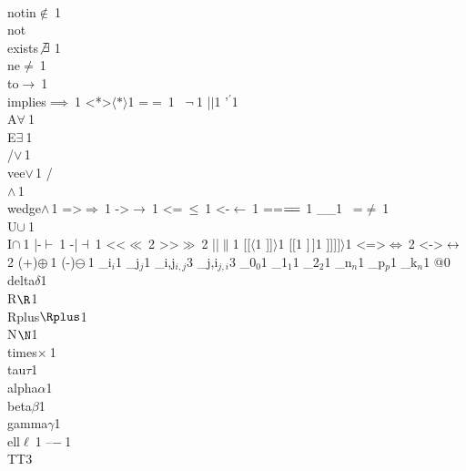 {		{\\notin}{{$\notin\ $}}1
		{\\not\\exists}{{$\not\exists\ $}}1
		{\\ne}{{$\ne\ $}}1
		{\\to}{{$\to\ $}}1
		{\\implies}{{$\implies\ $}}1
		{<*>}{{$\langle*\rangle$}}1
		{=}{{$=\ $}}1
		{~}{{$\neg\ $}}1
		{|}{{$\mid$}}1
		{'}{{$^\prime$}}1
		{\\A}{{$\forall\ $}}1
		{\\E}{{$\exists\ $}}1
		{\\/}{{$\vee\,$}}1
		{\\vee}{{$\vee\,$}}1
		{/\\}{{$\wedge\,$}}1
		{\\wedge}{{$\wedge\,$}}1
		{=>}{{$\Rightarrow\ $}}1
		{->}{{$\rightarrow\ $}}1
		{<=}{{$\ \leq\ $}}1
		{<-}{{$\leftarrow\ $}}1
		{==}{{$=\mathrel{\mkern-3mu}=\ $}}1
		{_}{{\_}}1
		{~=}{{$\neq\ $}}1
		{\\U}{{$\cup\ $}}1
		{\\I}{{$\cap\ $}}1
		{|-}{{$\vdash\ $}}1
		{-|}{{$\dashv\ $}}1
		{<<}{{$\ll\ $}}2
		{>>}{{$\gg\ $}}2
		{||}{{$\|$}}1
		{[[}{{$\langle$}}1
		{]]}{{$\rangle$}}1
		{[}{{$[$}}1
		{]}{{$\,]$}}1
		{]]]}{{$]\rangle$}}1
		{<=>}{{$\Leftrightarrow\ $}}2
		{<->}{{$\leftrightarrow\ $}}2
		{(+)}{{$\oplus\ $}}1
		{(-)}{{$\ominus\ $}}1
		{_i}{{$_{i}$}}1
		{_j}{{$_{j}$}}1
		{_{i,j}}{{$_{i,j}$}}3
		{_{j,i}}{{$_{j,i}$}}3
		{_0}{{$_0$}}1
		{_1}{{$_1$}}1
		{_2}{{$_2$}}1
		{_n}{{$_n$}}1
		{_p}{{$_p$}}1
		{_k}{{$_n$}}1
		{@}{{}}0
		{\\delta}{{$\delta$}}1
		{\\R}{{$\R$}}1
		{\\Rplus}{{$\Rplus$}}1
		{\\N}{{$\N$}}1
		{\\times}{{$\times\ $}}1
		{\\tau}{{$\tau$}}1
		{\\alpha}{{$\alpha$}}1
		{\\beta}{{$\beta$}}1
		{\\gamma}{{$\gamma$}}1
		{\\ell}{{$\ell\ $}}1
		{--}{{$-\ $}}1
		{\\TT}{{\hspace{1.5em}}}3
	}
	
